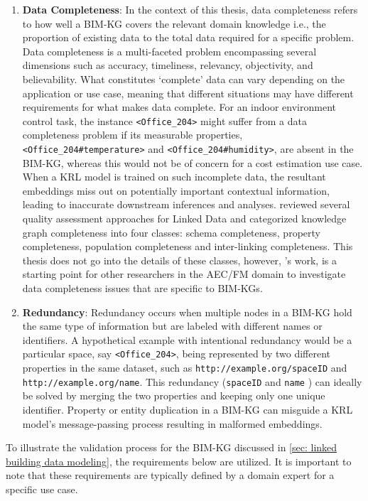 \begin{enumerate}
    \item 
    \textbf{Data Completeness}: In the context of this thesis, data completeness refers to how well a \ac{BIM-KG} covers the relevant domain knowledge i.e., the proportion of existing data to the total data required for a specific problem. Data completeness is a multi-faceted problem encompassing several dimensions such as accuracy, timeliness, relevancy, objectivity, and believability. What constitutes `complete' data can vary depending on the application or use case, meaning that different situations may have different requirements for what makes data complete. For an indoor environment control task, the instance \texttt{<Office\_204>} might suffer from a data completeness problem if its measurable properties, \texttt{<Office\_204\#temperature>} and \texttt{<Office\_204\#humidity>}, are absent in the \ac{BIM-KG}, whereas this would not be of concern for a cost estimation use case.  When a \ac{KRL} model is trained on such incomplete data, the resultant embeddings miss out on potentially important contextual information, leading to inaccurate downstream inferences and analyses. \cite{Zaveri2016QualitySurvey} reviewed several quality assessment approaches for Linked Data and categorized knowledge graph completeness into four classes: schema completeness, property completeness, population completeness and inter-linking completeness. This thesis does not go into the details of these classes, however, \cite{Zaveri2016QualitySurvey}'s work, is a starting point for other researchers in the \ac{AEC/FM} domain to investigate data completeness issues that are specific to \acp{BIM-KG}.

    \item 
    \textbf{Redundancy}: Redundancy occurs when multiple nodes in a \ac{BIM-KG} hold the same type of information but are labeled with different names or identifiers. A hypothetical example with intentional redundancy would be a particular space, say \texttt{<Office\_204>}, being represented by two different properties in the same dataset, such as \texttt{http://example.org/spaceID} and \texttt{http://example.org/name}. This redundancy (\texttt{spaceID} and \texttt{name} ) can ideally be solved by merging the two properties and keeping only one unique identifier. Property or entity duplication in a \ac{BIM-KG} can misguide a \ac{KRL} model's message-passing process resulting in malformed embeddings.
\end{enumerate}

\noindent To illustrate the validation process for the \ac{BIM-KG} discussed in \autoref{sec: linked building data modeling}, the requirements below are utilized. It is important to note that these requirements are typically defined by a domain expert for a specific use case. 

